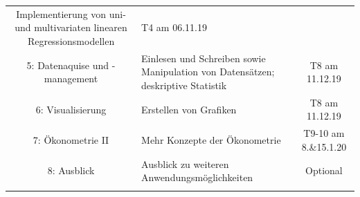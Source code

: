 \documentclass[]{book}
\begin{document}
\begin{longtable}[]{@{}clc@{}}
\begin{minipage}[t]{0.34\columnwidth}
Implementierung von uni- und multivariaten linearen
Regressionsmodellen\strut
\end{minipage} & \begin{minipage}[t]{0.34\columnwidth}\centering\strut
T4 am 06.11.19\strut
\end{minipage}\tabularnewline
\begin{minipage}[t]{0.24\columnwidth}\centering\strut
5: Datenaquise und -management\strut
\end{minipage} & \begin{minipage}[t]{0.34\columnwidth}\raggedright\strut
Einlesen und Schreiben sowie Manipulation von Datensätzen; deskriptive
Statistik\strut
\end{minipage} & \begin{minipage}[t]{0.34\columnwidth}\centering\strut
T8 am 11.12.19\strut
\end{minipage}\tabularnewline
\begin{minipage}[t]{0.24\columnwidth}\centering\strut
6: Visualisierung\strut
\end{minipage} & \begin{minipage}[t]{0.34\columnwidth}\raggedright\strut
Erstellen von Grafiken\strut
\end{minipage} & \begin{minipage}[t]{0.34\columnwidth}\centering\strut
T8 am 11.12.19\strut
\end{minipage}\tabularnewline
\begin{minipage}[t]{0.24\columnwidth}\centering\strut
7: Ökonometrie II\strut
\end{minipage} & \begin{minipage}[t]{0.34\columnwidth}\raggedright\strut
Mehr Konzepte der Ökonometrie\strut
\end{minipage} & \begin{minipage}[t]{0.34\columnwidth}\centering\strut
T9-10 am 8.\&15.1.20\strut
\end{minipage}\tabularnewline
\begin{minipage}[t]{0.24\columnwidth}\centering\strut
8: Ausblick\strut
\end{minipage} & \begin{minipage}[t]{0.34\columnwidth}\raggedright\strut
Ausblick zu weiteren Anwendungsmöglichkeiten\strut
\end{minipage} & \begin{minipage}[t]{0.34\columnwidth}\centering\strut
Optional\strut
\end{minipage}\tabularnewline
\begin{minipage}[t]{0.24\columnwidth}\centering\strut

\end{minipage}
\end{longtable}
\end{document}
